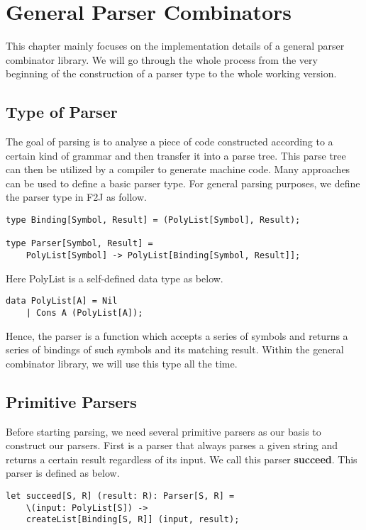 \chapter{General Parser Combinators}
This chapter mainly focuses on the implementation details of a general parser combinator library. We will go through the whole process from the very beginning of the construction of a parser type to the whole working version.

\section{Type of Parser}
The goal of parsing is to analyse a piece of code constructed according to a certain kind of grammar and then transfer it into a parse tree. This parse tree can then be utilized by a compiler to generate machine code. Many approaches can be used to define a basic parser type. For general parsing purposes, we define the parser type in F2J as follow.

\begin{lstlisting}
type Binding[Symbol, Result] = (PolyList[Symbol], Result);

type Parser[Symbol, Result] =
	PolyList[Symbol] -> PolyList[Binding[Symbol, Result]];
\end{lstlisting}

Here PolyList is a self-defined data type as below.

\begin{lstlisting}
data PolyList[A] = Nil
	| Cons A (PolyList[A]);
\end{lstlisting}

Hence, the parser is a function which accepts a series of symbols and returns a series of bindings of such symbols and its matching result. Within the general combinator library, we will use this type all the time.

\section{Primitive Parsers}
Before starting parsing, we need several primitive parsers as our basis to construct our parsers. First is a parser that always parses a given string and returns a certain result regardless of its input. We call this parser \textbf{succeed}. This parser is defined as below.

\begin{lstlisting}
let succeed[S, R] (result: R): Parser[S, R] =
	\(input: PolyList[S]) ->
	createList[Binding[S, R]] (input, result);
\end{lstlisting}

